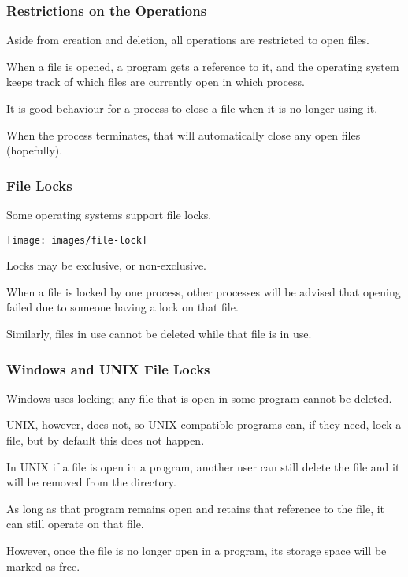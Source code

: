 \begin{frame}
	\frametitle{Restrictions on the Operations}

	Aside from creation and deletion, all operations are restricted to open files.

	When a file is opened, a program gets a reference to it, and the operating system keeps track of which files are currently open in which process.

	It is good behaviour for a process to close a file when it is no longer using it.

	When the process terminates, that will automatically close any open files (hopefully).

\end{frame}

\begin{frame}
	\frametitle{File Locks}

	Some operating systems support file locks.

	\begin{center}
		\texttt{[image: images/file-lock]}
	\end{center}

	Locks may be exclusive, or non-exclusive.

	When a file is locked by one process, other processes will be advised that opening failed due to someone having a lock on that file.

	Similarly, files in use cannot be deleted while that file is in use.

\end{frame}

\begin{frame}
	\frametitle{Windows and UNIX File Locks}

	Windows uses locking; any file that is open in some program cannot be deleted.

	UNIX, however, does not, so UNIX-compatible programs can, if they need, lock a file, but by default this does not happen.

	In UNIX if a file is open in a program, another user can still delete the file and it will be removed from the directory.

	As long as that program remains open and retains that reference to the file, it can still operate on that file.

	However, once the file is no longer open in a program, its storage space will be marked as free.

\end{frame}


